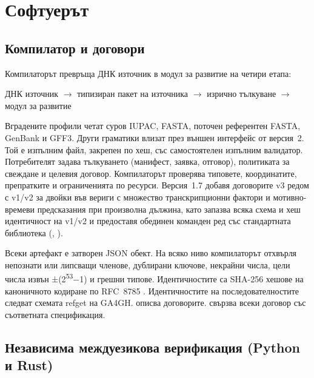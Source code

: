 \documentclass[10.5pt,a4paper]{article}
\begin{document}
\section{Софтуерът}\label{sec:software}

\subsection{Компилатор и договори}

Компилаторът превръща ДНК източник в модул за развитие на четири етапа:
\begin{center}ДНК източник $\rightarrow$ типизиран пакет на източника $\rightarrow$ изрично тълкуване $\rightarrow$ модул за развитие\end{center}
Вградените профили четат суров IUPAC, FASTA, поточен референтен FASTA, GenBank и GFF3. Други граматики влизат през външен интерфейс от версия~2. Той е изпълним файл, закрепен по хеш, със самостоятелен изпълним валидатор. Потребителят задава тълкуването (манифест, заявка, отговор), политиката за свеждане и целевия договор. Компилаторът проверява типовете, координатите, препратките и ограниченията по ресурси. Версия~1.7 добавя договорите  v3 редом с v1/v2 за двойки във вериги с множество транскрипционни фактори и мотивно-времеви предсказания при произволна дължина, като запазва всяка схема и хеш идентичност на v1/v2 и предоставя обединен команден ред със стандартната библиотека (, ).

Всеки артефакт е затворен JSON обект. На всяко ниво компилаторът отхвърля непознати или липсващи членове, дублирани ключове, некрайни числа, цели числа извън ±(2\textsuperscript{53}−1) и грешни типове. Идентичностите са SHA-256 хешове на каноничното кодиране по RFC~8785 \citep{rundgren2020,nist2015}. Идентичностите на последователностите следват схемата refget на GA4GH.  описва договорите.  свързва всеки договор със съответната спецификация.

\subsection{Независима междуезикова верификация (Python и Rust)}
\end{document}
